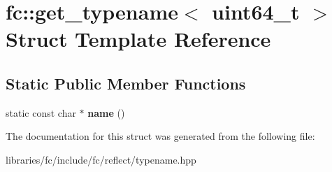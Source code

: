 \hypertarget{structfc_1_1get__typename_3_01uint64__t_01_4}{}\section{fc\+:\+:get\+\_\+typename$<$ uint64\+\_\+t $>$ Struct Template Reference}
\label{structfc_1_1get__typename_3_01uint64__t_01_4}
\subsection*{Static Public Member Functions}
\begin{DoxyCompactItemize}
\item 
\mbox{\label{structfc_1_1get__typename_3_01uint64__t_01_4_ae0fcd526af08c740bcc72ccb22f08fe9}} 
static const char $\ast$ {\bfseries name} ()
\end{DoxyCompactItemize}


The documentation for this struct was generated from the following file\+:\begin{DoxyCompactItemize}
\item 
libraries/fc/include/fc/reflect/typename.\+hpp\end{DoxyCompactItemize}
